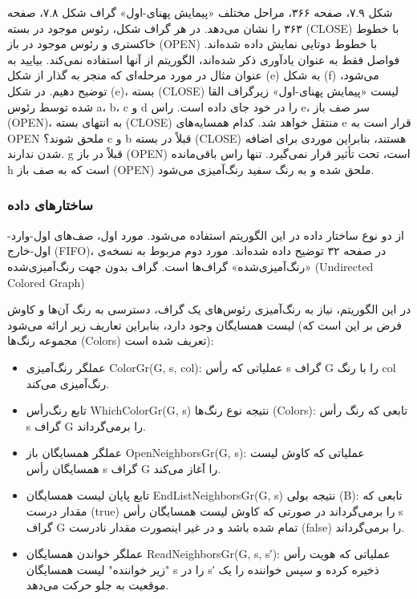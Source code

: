 \documentclass{book} %
\begin{document}
شکل ۷.۹، صفحه ۳۶۶، مراحل مختلف «پیمایش پهنای-اول» گراف شکل ۷.۸، صفحه ۳۶۳ را نشان می‌دهد. در هر گراف شکل، رئوس موجود در بسته (CLOSE) با خطوط خاکستری و رئوس موجود در باز (OPEN) با خطوط دوتایی نمایش داده شده‌اند. فواصل فقط به عنوان یادآوری ذکر شده‌اند، الگوریتم از آنها استفاده نمی‌کند. بیایید به عنوان مثال در مورد مرحله‌ای که منجر به گذار از شکل (e) به شکل (f) می‌شود، توضیح دهیم. در شکل (e)، بسته (CLOSE) لیست «پیمایش پهنای-اول» زیرگراف القا شده توسط رئوس a، b، c و d را در خود جای داده است. راس e، سر صف باز (OPEN)، به انتهای بسته (CLOSE) منتقل خواهد شد. کدام همسایه‌های e قرار است به OPEN ملحق شوند؟ c و b قبلاً در بسته (CLOSE) هستند، بنابراین موردی برای اضافه شدن ندارند. g  قبلاً در  باز (OPEN) است، تحت تأثیر قرار نمی‌گیرد. تنها راس باقی‌مانده h است که به صف باز (OPEN) ملحق شده و به رنگ سفید رنگ‌آمیزی می‌شود.

\subsubsection*{ساختارهای داده}

از دو نوع ساختار داده در این الگوریتم استفاده می‌شود. مورد اول، صف‌های اول-وارد-اول-خارج (FIFO)، در صفحه ۳۲ توضیح داده شده‌اند. مورد دوم مربوط به نسخه‌ی «رنگ‌آمیزی‌شده» گراف‌ها است.
گراف بدون جهت رنگ‌آمیزی‌شده (Undirected Colored Graph)

در این الگوریتم، نیاز به رنگ‌آمیزی رئوس‌های یک گراف، دسترسی به رنگ آن‌ها و کاوش لیست همسایگان وجود دارد، بنابراین تعاریف زیر ارائه می‌شود (فرض بر این است که مجموعه رنگ‌ها (Colors) تعریف شده است):

\begin{itemize}
    \item عملگر رنگ‌آمیزی‌ ColorGr(G, s, col): عملیاتی که رأس s گراف G را با رنگ col رنگ‌آمیزی می‌کند.
   
    \item تابع رنگ‌رأس‌ WhichColorGr(G, s) نتیجه نوع رنگ‌ها (Colors): تابعی که رنگ رأس s گراف G را برمی‌گرداند.
   
    \item عملگر همسایگان باز OpenNeighborsGr(G, s): عملیاتی که کاوش لیست همسایگان رأس s گراف G را آغاز می‌کند.
   
    \item تابع پایان لیست همسایگان‌ EndListNeighborsGr(G, s) نتیجه بولی (B): تابعی که مقدار درست (true) را برمی‌گرداند در صورتی که کاوش لیست همسایگان رأس s گراف G تمام شده باشد و در غیر اینصورت مقدار نادرست (false) را برمی‌گرداند.
   
    \item عملگر خواندن همسایگان‌ ReadNeighborsGr(G, s, s′): عملیاتی که هویت رأس "زیر خواننده" لیست همسایگان s را در s′ ذخیره کرده و سپس خواننده را یک موقعیت به جلو حرکت می‌دهد.

\end{itemize}
\end{document}
